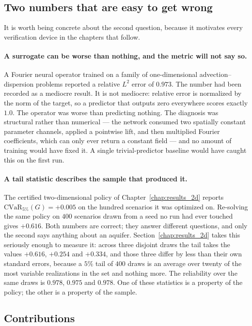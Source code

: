 \documentclass[11pt]{article}
\begin{document}
\subsection{Two numbers that are easy to get wrong}

It is worth being concrete about the second question, because it motivates every
verification device in the chapters that follow.

\paragraph{A surrogate can be worse than nothing, and the metric will not say so.}
A Fourier neural operator trained on a family of one-dimensional
advection--dispersion problems reported a relative $L^2$ error of $0.973$. The
number had been recorded as a mediocre result. It is not mediocre: relative error
is normalized by the norm of the target, so a predictor that outputs zero
everywhere scores exactly $1.0$. The operator was worse than predicting nothing.
The diagnosis was structural rather than numerical --- the network consumed two
spatially constant parameter channels, applied a pointwise lift, and then
multiplied Fourier coefficients, which can only ever return a constant field ---
and no amount of training would have fixed it. A single trivial-predictor
baseline would have caught this on the first run.

\paragraph{A tail statistic describes the sample that produced it.} The certified
two-dimensional policy of Chapter~\ref{chap:results_2d} reports
$\mathrm{CVaR}_{5\%}(G) = +0.005$ on the hundred scenarios it was optimized on.
Re-solving the same policy on $400$ scenarios drawn from a seed no run had ever
touched gives $+0.616$. Both numbers are correct; they answer different questions,
and only the second says anything about an aquifer. Section~\ref{chap:results_2d}
takes this seriously enough to measure it: across three disjoint draws the tail
takes the values $+0.616$, $+0.254$ and $+0.334$, and those three differ by less
than their own standard errors, because a $5\%$ tail of $400$ draws is an average
over twenty of the most variable realizations in the set and nothing more. The
reliability over the same draws is $0.978$, $0.975$ and $0.978$. One of these
statistics is a property of the policy; the other is a property of the sample.

\subsection{Contributions}
\end{document}
